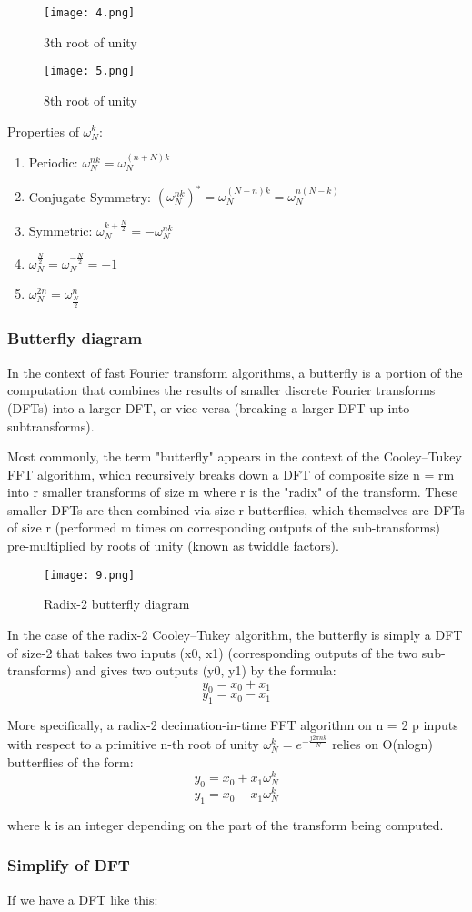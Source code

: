 \documentclass[12pt,a4paper]{article}
\begin{document}
\begin{center}
\begin{figure}[hbtp]
\centering
\texttt{[image: 4.png]}
\caption{3th root of unity}
\end{figure}
\end{center}
\begin{figure}[hbtp]
\centering
\texttt{[image: 5.png]}
\caption{8th root of unity}
\end{figure}
Properties of $\omega_N^k$:
\begin{enumerate}
\item Periodic: $\omega_N^{nk}=\omega_N^{(n+N)k}$
\item Conjugate Symmetry: $(\omega_N^{nk})^*=\omega_N^{(N-n)k}=\omega_N^{n(N-k)}$
\item Symmetric: $\omega_N^{k+\frac{N}{2}}=-\omega_N^{nk}$
\item $\omega_N^{\frac{N}{2}}=\omega_N^{-\frac{N}{2}}=-1$
\item $\omega_N^{2n}=\omega_{\frac{N}{2}}^{n}$
\end{enumerate}

\subsubsection{Butterfly diagram}
In the context of fast Fourier transform algorithms, a butterfly is a portion of the computation that combines the results of smaller discrete Fourier transforms (DFTs) into a larger DFT, or vice versa (breaking a larger DFT up into subtransforms). 


Most commonly, the term "butterfly" appears in the context of the Cooley–Tukey FFT algorithm, which recursively breaks down a DFT of composite size n = rm into r smaller transforms of size m where r is the "radix" of the transform. These smaller DFTs are then combined via size-r butterflies, which themselves are DFTs of size r (performed m times on corresponding outputs of the sub-transforms) pre-multiplied by roots of unity (known as twiddle factors). 
\begin{figure}[hbtp]
\centering
\texttt{[image: 9.png]}
\caption{Radix-2 butterfly diagram}
\end{figure}

In the case of the radix-2 Cooley–Tukey algorithm, the butterfly is simply a DFT of size-2 that takes two inputs (x0, x1) (corresponding outputs of the two sub-transforms) and gives two outputs (y0, y1) by the formula:
$$y_0=x_0+x_1$$
$$y_1=x_0-x_1$$

More specifically, a radix-2 decimation-in-time FFT algorithm on n = 2 p inputs with respect to a primitive n-th root of unity $\omega _{N}^{k}=e^{-{\frac {j2\pi n
k}{N}}}$ relies on O(nlogn) butterflies of the form:
$$y_0=x_0+x_1 \omega _{N}^{k}$$
$$y_1=x_0-x_1 \omega _{N}^{k}$$

where k is an integer depending on the part of the transform being computed. 


\subsubsection{Simplify of DFT}
If we have a DFT like this:
\end{document}
